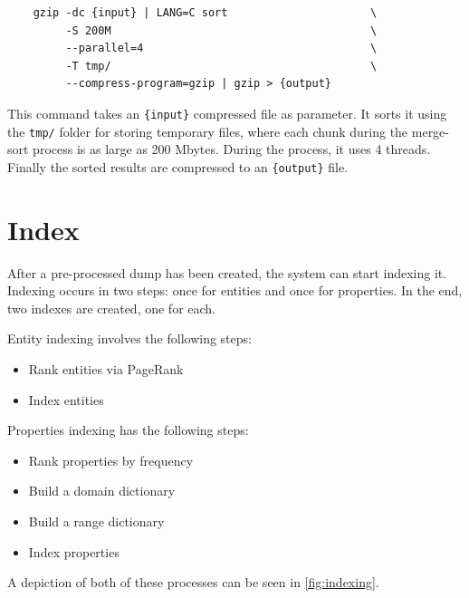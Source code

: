 \begin{verbatim}
    gzip -dc {input} | LANG=C sort                      \
         -S 200M                                        \
         --parallel=4                                   \
         -T tmp/                                        \
         --compress-program=gzip | gzip > {output}
\end{verbatim}

This command takes an \texttt{\{input\}} compressed file as parameter. It sorts it using the \texttt{tmp/} folder for storing temporary files, where each chunk during the merge-sort process is as large as 200 Mbytes. During the process, it uses 4 threads. Finally the sorted results are compressed to an \texttt{\{output\}} file.


\section{Index}
\label{chap:index}

After a pre-processed dump has been created, the system can start indexing it. 
Indexing occurs in two steps: once for entities and once for properties. In the end, two indexes are created, one for each.

Entity indexing involves the following steps:
\begin{itemize}
    \item Rank entities via PageRank
    \item Index entities
\end{itemize}

Properties indexing has the following steps:
\begin{itemize}
    \item Rank properties by frequency
    \item Build a domain dictionary
    \item Build a range dictionary
    \item Index properties
\end{itemize}

A depiction of both of these processes can be seen in \autoref{fig:indexing}.


